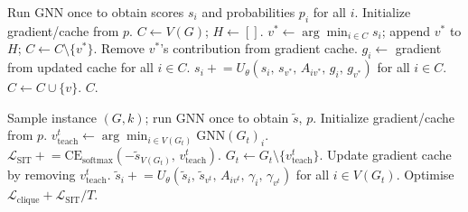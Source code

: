 \documentclass[journal,article,submit,pdftex,moreauthors]{Definitions/mdpi}
\begin{document}
\begin{algorithm}[H]
  \caption{U-LPR: Cached-Deletion Decoder}
  \label{alg:gub}
  \begin{algorithmic}[1]
    \State Run GNN once to obtain scores $s_i$ and probabilities $p_i$ for all $i$.
    \State Initialize gradient/cache from $p$. \hfill{}
    \State $C \leftarrow V(G)$;\; $H \leftarrow []$.
    \State $v^* \leftarrow \arg\min_{i \in C} s_i$;\; append $v^*$ to $H$;\;
    $C \leftarrow C \setminus \{v^*\}$.
    \State Remove $v^*$'s contribution from gradient cache. \hfill{}
    \State $g_i \leftarrow$ gradient from updated cache for all $i \in C$.
    \hfill{}
    \State $s_i \mathrel{+}= U_\theta(s_i,\, s_{v^*},\, A_{iv^*},\, g_i,\,
    g_{v^*})$ for all $i \in C$. \hfill{}
    \EndWhile
     $C \leftarrow C \cup \{v\}$. \EndIf
    \EndFor
    \State \Return $C$.
  \end{algorithmic}
\end{algorithm}

\begin{algorithm}[H]
  \caption{SIT Training Step}
  \label{alg:sit_training}
  \begin{algorithmic}[1]
    \State Sample instance $(G, k)$; run GNN once to obtain $\tilde{s}$, $p$.
    \State Initialize gradient/cache from $p$.
    \hfill{}
    \State $v^t_{\mathrm{teach}} \leftarrow \arg\min_{i \in V(G_t)}
    \mathrm{GNN}(G_t)_i$. \hfill{}
    \State $\mathcal{L}_{\mathrm{SIT}} \mathrel{+}=
    \mathrm{CE}_{\mathrm{softmax}}(-\tilde{s}_{V(G_t)},\,
    v^t_{\mathrm{teach}})$.
    \hfill{}
    \State $G_t \leftarrow G_t \setminus \{v^t_{\mathrm{teach}}\}$.
    \State Update gradient cache by removing $v^t_{\mathrm{teach}}$.
    \hfill{}
    \State $\tilde{s}_i \mathrel{+}= U_\theta(\tilde{s}_i,\,
    \tilde{s}_{v^t},\, A_{iv^t},\, \gamma_i,\, \gamma_{v^t})$
    for all $i \in V(G_t)$.
    \EndFor
    \State Optimise $\mathcal{L}_{\mathrm{clique}} +
    \mathcal{L}_{\mathrm{SIT}} / T$.
  \end{algorithmic}
\end{algorithm}
\end{document}
